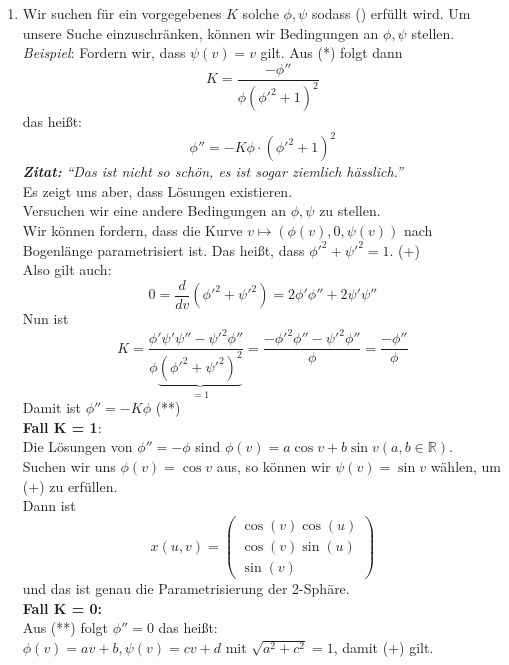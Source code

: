 \begin{solution}
\begin{enumerate}[label= (\alph*)]
    \item 
    Wir suchen für ein vorgegebenes \( K \) solche \( \phi, \psi \) sodass (\*) erfüllt wird. Um unsere Suche einzuschränken, können wir Bedingungen an \( \phi, \psi \) stellen. \\
    \emph{Beispiel}: Fordern wir, dass \( \psi(v) = v \) gilt. Aus (*) folgt dann 
    \begin{equation*}
      K = \frac{-\phi''}{\phi{(\phi'^2 + 1)}^2}
    \end{equation*} 
    das heißt:
    \begin{equation*}
      \phi'' = -K \phi \cdot {(\phi'^2 + 1)}^2
    \end{equation*} 
    \emph{\textbf{Zitat:}} \emph{``Das ist nicht so schön, es ist sogar ziemlich hässlich.''} \\
    Es zeigt uns aber, dass Lösungen existieren. \\
    Versuchen wir eine andere Bedingungen an \( \phi, \psi \) zu stellen. \\
    Wir können fordern, dass die Kurve \( v \mapsto (\phi(v), 0, \psi(v)) \) nach Bogenlänge parametrisiert ist. Das heißt, dass \( \phi'^2 + \psi'^2 = 1 \). (+)\\
    Also gilt auch:
    \begin{equation*}
      0 = \frac{d}{dv}(\phi'^2 + \psi'^2) = 2 \phi'\phi'' + 2 \psi' \psi''
    \end{equation*}
    Nun ist 
    \begin{equation*}
      K = \frac{\phi' \psi' \psi'' - \psi'^2 \phi''}{\phi\underbrace{{(\phi'^2 + \psi'^2)}^2}_{= 1}} = \frac{-\phi'^2 \phi'' - \psi'^2 \phi''}{\phi} = \frac{-\phi''}{\phi}
    \end{equation*}
    Damit ist \( \phi'' = -K \phi \) (**) \\
    \textbf{Fall K = 1}: \\
    Die Lösungen von \( \phi'' = - \phi \) sind \( \phi(v) = a \cos v + b \sin v (a,b \in \mathbb{R}) \). \\
    Suchen wir uns \( \phi(v) = \cos v \) aus, so können wir \( \psi(v) = \sin v \) wählen, um (+) zu erfüllen. \\
    Dann ist
    \begin{equation*}
      x(u,v) = \begin{pmatrix}
        \cos(v) \cos(u) \\
        \cos(v) \sin(u) \\
        \sin(v) 
      \end{pmatrix}
    \end{equation*}
    und das ist genau die Parametrisierung der 2-Sphäre. \\
    \textbf{Fall K = 0:} \\
    Aus (**) folgt \( \phi'' = 0 \) das heißt: \\
    \( \phi(v) = av + b, \psi(v) = cv + d \) mit \( \sqrt{ a^2 + c^2} = 1 \), damit (+) gilt. \\
    

\end{enumerate}
\end{solution}
